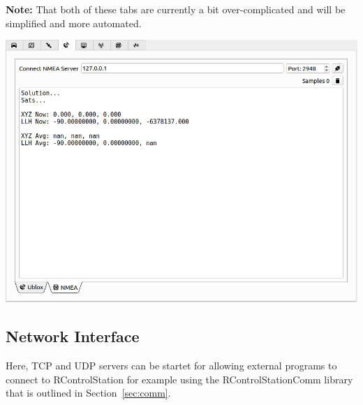 \documentclass[12pt]{article} %
\begin{document}
\noindent\begin{minipage}{0.5\linewidth}

{\bf Note:} That both of these tabs are currently a bit
over-complicated and will be simplified and more automated. 

\end{minipage}
\noindent\begin{minipage}{0.5\linewidth}
\noindent \includegraphics[width=\textwidth]{./screens/base_station_NMEA.png}
\end{minipage}

\subsection{Network Interface}

Here, TCP and UDP servers can be startet for allowing external programs to connect
to RControlStation for example using the RControlStationComm library that is outlined
in Section~\ref{sec:comm}.
\end{document}
